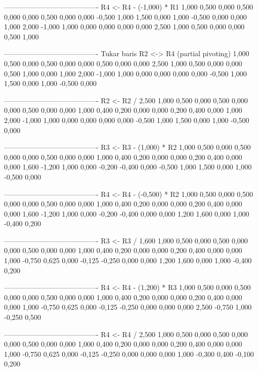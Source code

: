 \documentclass[12pt]{article}
\begin{document}
\begin{enumerate}
\begin{keluaran}
----------------------------------------
R4 <- R4 - (-1,000) * R1
1,000   0,500   0,000   0,500   0,000   0,000   0,500   0,000
0,000   -0,500  1,000   1,500   0,000   1,000   -0,500  0,000
0,000   1,000   2,000   -1,000  1,000   0,000   0,000   0,000
0,000   2,500   1,000   0,500   0,000   0,000   0,500   1,000

----------------------------------------
Tukar baris R2 <-> R4 (partial pivoting)
1,000   0,500   0,000   0,500   0,000   0,000   0,500   0,000
0,000   2,500   1,000   0,500   0,000   0,000   0,500   1,000
0,000   1,000   2,000   -1,000  1,000   0,000   0,000   0,000
0,000   -0,500  1,000   1,500   0,000   1,000   -0,500  0,000

----------------------------------------
R2 <- R2 / 2,500
1,000   0,500   0,000   0,500   0,000   0,000   0,500   0,000
0,000   1,000   0,400   0,200   0,000   0,000   0,200   0,400
0,000   1,000   2,000   -1,000  1,000   0,000   0,000   0,000
0,000   -0,500  1,000   1,500   0,000   1,000   -0,500  0,000

----------------------------------------
R3 <- R3 - (1,000) * R2
1,000   0,500   0,000   0,500   0,000   0,000   0,500   0,000
0,000   1,000   0,400   0,200   0,000   0,000   0,200   0,400
0,000   0,000   1,600   -1,200  1,000   0,000   -0,200  -0,400
0,000   -0,500  1,000   1,500   0,000   1,000   -0,500  0,000

----------------------------------------
R4 <- R4 - (-0,500) * R2
1,000   0,500   0,000   0,500   0,000   0,000   0,500   0,000
0,000   1,000   0,400   0,200   0,000   0,000   0,200   0,400
0,000   0,000   1,600   -1,200  1,000   0,000   -0,200  -0,400
0,000   0,000   1,200   1,600   0,000   1,000   -0,400  0,200

----------------------------------------
R3 <- R3 / 1,600
1,000   0,500   0,000   0,500   0,000   0,000   0,500   0,000
0,000   1,000   0,400   0,200   0,000   0,000   0,200   0,400
0,000   0,000   1,000   -0,750  0,625   0,000   -0,125  -0,250
0,000   0,000   1,200   1,600   0,000   1,000   -0,400  0,200

----------------------------------------
R4 <- R4 - (1,200) * R3
1,000   0,500   0,000   0,500   0,000   0,000   0,500   0,000
0,000   1,000   0,400   0,200   0,000   0,000   0,200   0,400
0,000   0,000   1,000   -0,750  0,625   0,000   -0,125  -0,250
0,000   0,000   0,000   2,500   -0,750  1,000   -0,250  0,500

----------------------------------------
R4 <- R4 / 2,500
1,000   0,500   0,000   0,500   0,000   0,000   0,500   0,000
0,000   1,000   0,400   0,200   0,000   0,000   0,200   0,400
0,000   0,000   1,000   -0,750  0,625   0,000   -0,125  -0,250
0,000   0,000   0,000   1,000   -0,300  0,400   -0,100  0,200


\end{keluaran}
\end{enumerate}
\end{document}
